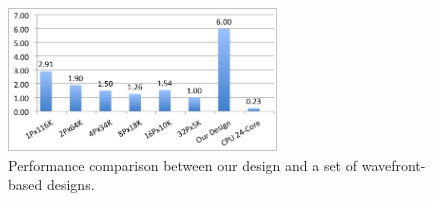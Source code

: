 \begin{figure}[!hbt]
	\begin{center}
		\includegraphics[width=2.8in]{Figures/F2C5.jpg}
		\caption {Performance comparison between our design and a set of wavefront-based designs.}
		\label{fig:F2C5}
	\end{center}
\end{figure}

